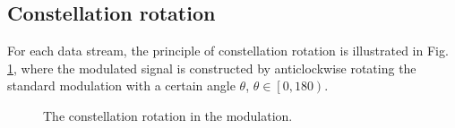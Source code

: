 \documentclass[conference]{IEEEtran}
\begin{document}
\subsection{Constellation rotation}
For each data stream, the principle of constellation rotation is illustrated in Fig. \ref{fig.3}, where the modulated signal is constructed by anticlockwise rotating the standard modulation with a certain angle $\theta $, ${\theta} \in \left[ {0,180} \right)$.
\begin{figure}[h!]
\vspace{-1em}
\setlength{\abovecaptionskip}{0.cm}
\setlength{\belowcaptionskip}{-0.cm}
  \caption{The constellation rotation in the modulation.}
    \vspace{-2em}\label{fig.3}
\end{figure}
\end{document}
